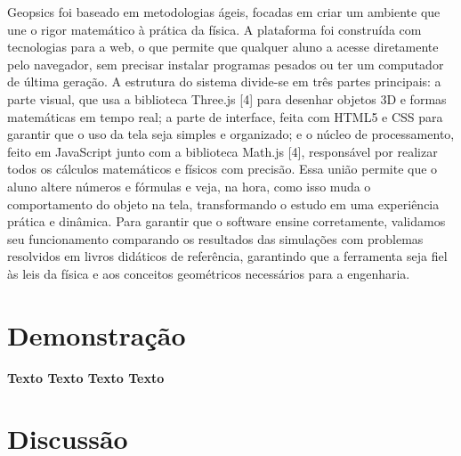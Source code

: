 \documentclass[conference,a4paper]{IEEEtran}
\begin{document}
Geopsics foi baseado em metodologias ágeis, focadas em criar um ambiente que une o rigor matemático à prática da física. A plataforma foi construída com tecnologias para a web, o que permite que qualquer aluno a acesse diretamente pelo navegador, sem precisar instalar programas pesados ou ter um computador de última geração. A estrutura do sistema divide-se em três partes principais: a parte visual, que usa a biblioteca Three.js [4] para desenhar objetos 3D e formas matemáticas em tempo real; a parte de interface, feita com HTML5 e CSS para garantir que o uso da tela seja simples e organizado; e o núcleo de processamento, feito em JavaScript junto com a biblioteca Math.js [4], responsável por realizar todos os cálculos matemáticos e físicos com precisão. Essa união permite que o aluno altere números e fórmulas e veja, na hora, como isso muda o comportamento do objeto na tela, transformando o estudo em uma experiência prática e dinâmica. Para garantir que o software ensine corretamente, validamos seu funcionamento comparando os resultados das simulações com problemas resolvidos em livros didáticos de referência, garantindo que a ferramenta seja fiel às leis da física e aos conceitos geométricos necessários para a engenharia.

\section{Demonstração}

\begin{center}
\textbf{Texto Texto Texto Texto}
\end{center}

\begin{figure}[h]
\centering
{}
\caption{ }
\label{fig:fisica}
\end{figure}

\begin{figure}[h]
\centering
{}
\caption{ }
\label{fig:geometria}
\end{figure}

\section{Discussão}
\end{document}
